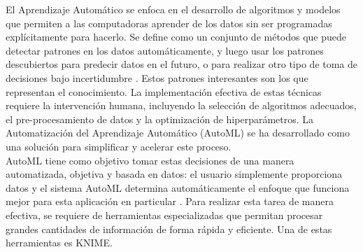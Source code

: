 El Aprendizaje Automático se enfoca en el desarrollo de algoritmos y modelos que permiten a las computadoras aprender de los datos sin ser programadas explícitamente para hacerlo. Se define como un conjunto de métodos que puede detectar patrones en los datos automáticamente, y luego usar los patrones descubiertos para predecir datos en el futuro, o para realizar otro tipo de toma de decisiones bajo incertidumbre \citep{murphy2012machine}. Estos patrones interesantes son los que representan el conocimiento. La implementación efectiva de estas técnicas requiere la intervención humana, incluyendo la selección de algoritmos adecuados, el pre-procesamiento de datos y la optimización de hiperparámetros. La Automatización del Aprendizaje Automático (AutoML) se ha desarrollado como una solución para simplificar y acelerar este proceso. \\
 AutoML tiene como objetivo tomar estas decisiones de una manera automatizada, objetiva y basada en datos: el usuario simplemente proporciona datos y el sistema AutoML determina automáticamente el enfoque que funciona mejor para esta aplicación en particular \citep{hutter2019automated}. Para realizar esta tarea de manera efectiva, se requiere de herramientas especializadas que permitan procesar grandes cantidades de información de forma rápida y eficiente. Una de estas herramientas es KNIME.\\

